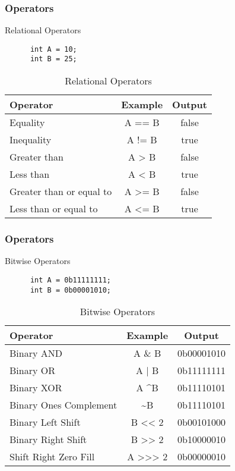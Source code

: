 \documentclass[10pt, compress]{beamer}
\begin{document}
\begin{frame}[fragile]
  \frametitle{Operators}
  \begin{block}{Relational Operators}
    \begin{verbatim}
      int A = 10;
      int B = 25;
    \end{verbatim}
    \begin{table}
      \begin{tabular}{lcc}
        \toprule
        Operator & Example & Output\\
        \midrule
        Equality & A == B & false\\
        Inequality & A != B & true\\
        Greater than & A > B & false\\
        Less than & A < B & true\\
        Greater than or equal to & A >= B & false\\
        Less than or equal to & A <= B & true\\
        \bottomrule
      \end{tabular}
      \caption{Relational Operators}
    \end{table}
  \end{block}
\end{frame}

\begin{frame}[fragile]
  \frametitle{Operators}
  \begin{block}{Bitwise Operators}
    \begin{verbatim}
      int A = 0b11111111;
      int B = 0b00001010;
    \end{verbatim}
    \begin{table}
      \begin{tabular}{lcc}
        \toprule
        Operator & Example & Output\\
        \midrule
        Binary AND & A \& B & 0b00001010\\
        Binary OR & A | B & 0b11111111\\
        Binary XOR & A \textasciicircum B & 0b11110101\\
        Binary Ones Complement & \textasciitilde B & 0b11110101\\
        Binary Left Shift & B <{}< 2 & 0b00101000\\
        Binary Right Shift & B >{}> 2 & 0b10000010\\
        Shift Right Zero Fill & A >{}>{}> 2 & 0b00000010 \\
        \bottomrule
      \end{tabular}
      \caption{Bitwise Operators}
    \end{table}
  \end{block}
\end{frame}
\end{document}

